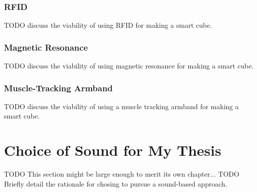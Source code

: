 \subsubsection{RFID}
TODO discuss the viability of using RFID for making a smart cube.
\subsubsection{Magnetic Resonance}
TODO discuss the viability of using magnetic resonance for making a smart cube.
\subsubsection{Muscle-Tracking Armband}
TODO discuss the viability of using a muscle tracking armband for making a smart cube.


\section{Choice of Sound for My Thesis}

TODO This section might be large enough to merit its own chapter...
TODO Briefly detail the rationale for chosing to pursue a sound-based approach.